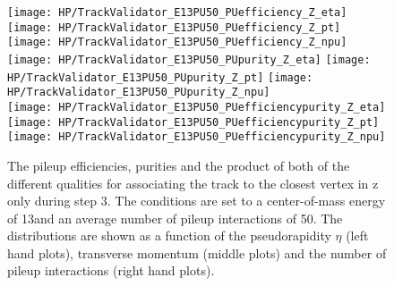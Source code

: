 \begin{figure}[!h]
  \centering
  \texttt{[image: HP/TrackValidator\_E13PU50\_PUefficiency\_Z\_eta]}
  \texttt{[image: HP/TrackValidator\_E13PU50\_PUefficiency\_Z\_pt]}
  \texttt{[image: HP/TrackValidator\_E13PU50\_PUefficiency\_Z\_npu]}
   \\
  \texttt{[image: HP/TrackValidator\_E13PU50\_PUpurity\_Z\_eta]}
  \texttt{[image: HP/TrackValidator\_E13PU50\_PUpurity\_Z\_pt]}
  \texttt{[image: HP/TrackValidator\_E13PU50\_PUpurity\_Z\_npu]}
   \\
  \texttt{[image: HP/TrackValidator\_E13PU50\_PUefficiencypurity\_Z\_eta]}
  \texttt{[image: HP/TrackValidator\_E13PU50\_PUefficiencypurity\_Z\_pt]}
  \texttt{[image: HP/TrackValidator\_E13PU50\_PUefficiencypurity\_Z\_npu]}
  \caption[Pileup efficiencies, purities and their product of the different qualities of the association map with associating the track to the closest vertex in z only during step 3 with 13\TeV and $\left<PU\right>=50$]{The pileup efficiencies, purities and the product of both of the different qualities for associating the track to the closest vertex in z only during step 3. The conditions are set to a center-of-mass energy of 13\TeV and an average number of pileup interactions of 50. The distributions are shown as a function of the pseudorapidity $\eta$ (left hand plots), transverse momentum (middle plots) and the number of pileup interactions (right hand plots).}
\end{figure}
\clearpage

